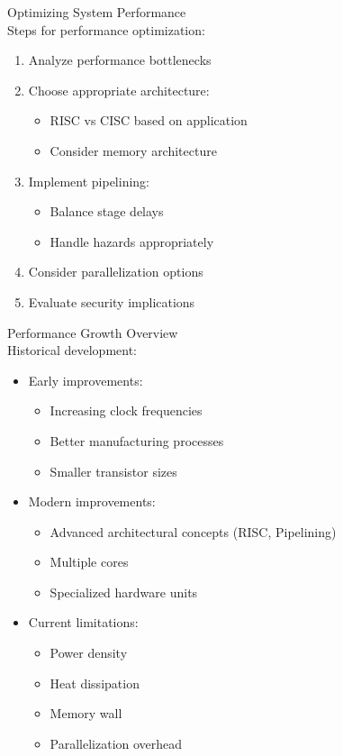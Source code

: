 \begin{KR}{Optimizing System Performance}\\
Steps for performance optimization:
\begin{enumerate}
  \item Analyze performance bottlenecks
  \item Choose appropriate architecture:
    \begin{itemize}
      \item RISC vs CISC based on application
      \item Consider memory architecture
    \end{itemize}
  \item Implement pipelining:
    \begin{itemize}
      \item Balance stage delays
      \item Handle hazards appropriately
    \end{itemize}
  \item Consider parallelization options
  \item Evaluate security implications
\end{enumerate}
\end{KR}

\begin{concept}{Performance Growth Overview}\\
Historical development:
\begin{itemize}
  \item Early improvements:
    \begin{itemize}
      \item Increasing clock frequencies
      \item Better manufacturing processes
      \item Smaller transistor sizes
    \end{itemize}
  \item Modern improvements:
    \begin{itemize}
      \item Advanced architectural concepts (RISC, Pipelining)
      \item Multiple cores
      \item Specialized hardware units
    \end{itemize}
  \item Current limitations:
    \begin{itemize}
      \item Power density
      \item Heat dissipation
      \item Memory wall
      \item Parallelization overhead
    \end{itemize}
\end{itemize}
\end{concept}

